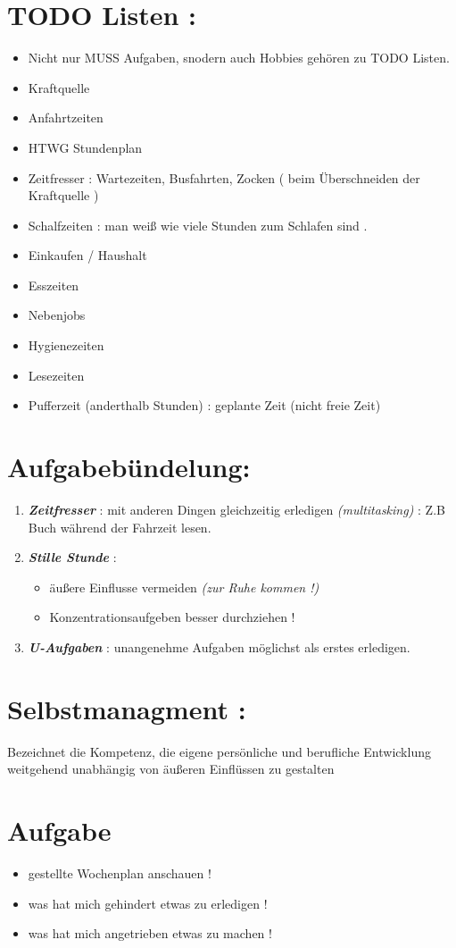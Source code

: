 \documentclass[11pt,a4paper]{article}
\begin{document}
\section*{TODO Listen :}
\begin{itemize}
\item Nicht nur MUSS Aufgaben, snodern auch Hobbies gehören zu TODO Listen.
\item Kraftquelle
\item Anfahrtzeiten
\item HTWG Stundenplan
\item Zeitfresser : Wartezeiten, Busfahrten, Zocken ( beim Überschneiden der Kraftquelle )
\item Schalfzeiten : man weiß wie viele Stunden zum Schlafen sind .
\item Einkaufen / Haushalt
\item Esszeiten 
\item Nebenjobs
\item Hygienezeiten
\item Lesezeiten
\item Pufferzeit (anderthalb Stunden) : geplante Zeit (nicht freie Zeit)
\end{itemize}

\section*{Aufgabebündelung: }
\begin{enumerate}
\item \textit{\textbf{Zeitfresser}} :  mit anderen Dingen gleichzeitig erledigen \emph{(multitasking)} : Z.B  Buch während der Fahrzeit lesen.
\item \textit{\textbf{Stille Stunde}} : 
 \begin{itemize}
 \item  äußere Einflusse vermeiden \emph{(zur Ruhe kommen !)}
 \item Konzentrationsaufgeben besser durchziehen !
 \end{itemize}
\item \textit{\textbf{U-Aufgaben}} : unangenehme Aufgaben möglichst als erstes erledigen.

\end{enumerate}

\section*{Selbstmanagment :}
Bezeichnet die Kompetenz, die eigene persönliche und berufliche Entwicklung weitgehend unabhängig von äußeren Einflüssen zu gestalten

\section*{Aufgabe}
\begin{itemize}
\item gestellte Wochenplan anschauen !
\item was hat mich gehindert etwas zu erledigen !
\item was hat mich angetrieben etwas zu machen !
\end{itemize}
\end{document}
